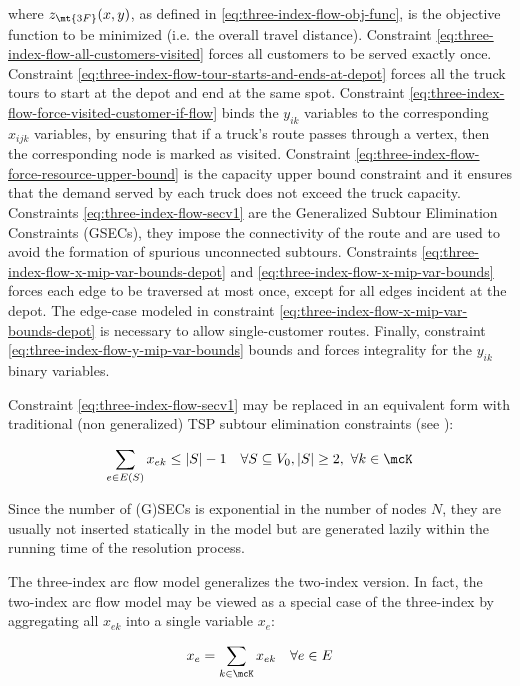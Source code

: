 where $z_\mt{3F}(x, y)$, as defined in \eqref{eq:three-index-flow-obj-func}, is the objective function to be minimized (i.e. the overall travel distance).
Constraint \eqref{eq:three-index-flow-all-customers-visited} forces all customers to be served exactly once.
Constraint \eqref{eq:three-index-flow-tour-starts-and-ends-at-depot} forces all the truck tours to start at the depot and end at the same spot.
Constraint \eqref{eq:three-index-flow-force-visited-customer-if-flow} binds the $y_{ik}$ variables to the corresponding $x_{ijk}$ variables, by ensuring that if a truck's route passes through a vertex, then the corresponding node is marked as visited.
Constraint \eqref{eq:three-index-flow-force-resource-upper-bound} is the capacity upper bound constraint and it ensures that the demand served by each truck does not exceed the truck capacity.
Constraints \eqref{eq:three-index-flow-secv1} are the Generalized Subtour Elimination Constraints (GSECs), they impose the connectivity of the route and are used to avoid the formation of spurious unconnected subtours.
Constraints \eqref{eq:three-index-flow-x-mip-var-bounds-depot} and \eqref{eq:three-index-flow-x-mip-var-bounds} forces each edge to be traversed at most once,
except for all edges incident at the depot.
The edge-case modeled in constraint \eqref{eq:three-index-flow-x-mip-var-bounds-depot} is necessary to allow single-customer routes.
Finally, constraint \eqref{eq:three-index-flow-y-mip-var-bounds} bounds and forces integrality for the $y_{ik}$ binary variables.

Constraint \eqref{eq:three-index-flow-secv1} may be replaced in an equivalent form with traditional (non generalized) TSP subtour elimination constraints (see \textcite{fisher1981}):

\begin{equation}\label{eq:three-index-flow-secv2}
	\sum_{e \in E(S)} x_{ek} \le |S| - 1 \quad \forall S \subseteq V_0, |S| \ge 2,\ \forall k \in \mcK
\end{equation}

Since the number of (G)SECs is exponential in the number of nodes $N$, they are usually not inserted statically in the model but are generated lazily within the running time of the resolution process.

The three-index arc flow model generalizes the two-index version.
In fact, the two-index arc flow model may be viewed as a special case of the three-index by aggregating
all $x_{ek}$ into a single variable $x_e$:


\begin{equation}
	x_e = \sum_{k \in \mcK} x_{ek} \quad \forall e \in E
\end{equation}


